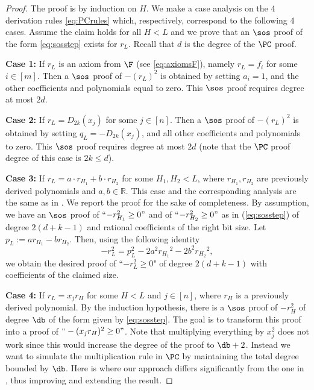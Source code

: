 \documentclass[11pt]{article}
\begin{document}
\begin{proof} 
The proof is by induction on $H$. We make a case analysis on the 4 derivation rules \eqref{eq:PCrules} which, respectively, correspond to the following 4 cases. Assume the claim holds for all $H<L$ and we prove that an $\sos$ proof of the form \cref{eq:sosstep} exists for $r_L$. Recall that $d$ is the degree of the $\PC$ proof.

\textbf{Case 1:} If $r_L$ is an axiom from $\F$ (see \eqref{eq:axiomsF}), namely $r_L=f_i$ for some $i\in [m]$.
Then a $\sos$ proof of $-(r_L)^2$ is obtained by setting $a_i=1$, and the other coefficients and polynomials equal to zero. This $\sos$ proof requires degree at most $2d$.

\textbf{Case 2:} If $r_L=D_{2k}(x_j)$ for some $j\in [n]$. Then a $\sos$ proof of $-(r_L)^2$ is obtained by setting $q_L=-D_{2k}(x_j)$, and all other coefficients  and polynomials to zero. This $\sos$ proof requires degree at most $2d$ (note that the $\PC$ proof degree of this case is $2k\leq d$).

\textbf{Case 3:} If $r_L= a\cdot r_{H_1} + b\cdot r_{H_2}$ for some $H_1,H_2<L$, where $r_{H_1}, r_{H_2}$ are previously derived polynomials and $a,b\in \mathbb{R}$. This case and the corresponding analysis are the same as in \cite{berkholz18}. We report the proof for the sake of completeness. By assumption, we have an $\sos$ proof of ``$-r_{H_1}^2\geq 0"$ and of ``$-r_{H_2}^2\geq 0"$ as in (\ref{eq:sosstep}) of degree $2(d+k-1)$ and rational coefficients of the right bit size.  Let $p_L:=ar_{H_1} - br_{H_2}$. Then, using the following identity  
$$-r_L^2 = p_L^2 -2a^2{r_{H_1}}^2 -2b^2{r_{H_2}}^2,$$
we obtain the desired proof of ``$-r_L^2\geq 0$" of degree $2(d+k-1)$ with coefficients of the claimed size. 


\textbf{Case 4:} If $r_L=x_j r_H$ for some $H<L$ and $j\in [n]$, where $r_H$ is a previously derived polynomial.
By the induction hypothesis, there is a $\sos$ proof of $-r_H^2$ of degree $\db$ of the form given by \eqref{eq:sosstep}.
The goal is to transform this proof into a proof of $``-(x_j r_H)^2\geq 0"$. Note that multiplying everything by $x_j^2$ does not work since this would increase the degree of the proof to $\db+2$. Instead we want to simulate the multiplication rule in $\PC$ by maintaining the total degree bounded by $\db$. Here is where our approach differs significantly from the one in \cite{berkholz18}, thus improving and extending the result.


\end{proof}
\end{document}
